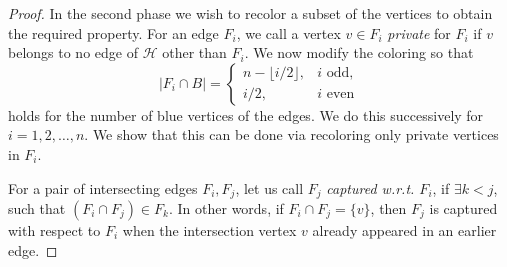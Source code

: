\documentclass[10pt]{article}
\theoremstyle{definition}
\begin{document}
\begin{proof}
		In the second phase we wish to recolor a subset of the vertices to obtain the required property. For an edge
		$F_i$, we call a vertex $v\in F_i$ \textit{private} for $F_i$ if $v$ belongs to no
		edge of $\mathcal H$ other than $F_i$.
		We now modify the coloring so that
		\[
		|F_i\cap B|=
		\begin{cases}
			n-\lfloor i/2\rfloor, & i \text{ odd},\\
			i/2, & i \text{ even}
		\end{cases}
		\]
		holds for the number of blue vertices of the edges. 
		We do this successively for $i=1,2,\dots,n$. We show that this can be done via recoloring only private vertices in
		$F_i$.
		
		
		For a pair of intersecting edges $F_i, F_j$, let us call $F_j$ \textit{captured w.r.t. $F_i$}, if $\exists k<j$, such that $(F_i\cap F_j)\in F_k$. In other words,   if $F_i\cap F_j=\{v\}$, then $F_j$ is captured with respect
		to $F_i$ when the intersection vertex $v$ already appeared in an earlier
		edge. %
		

\end{proof}
\end{document}
